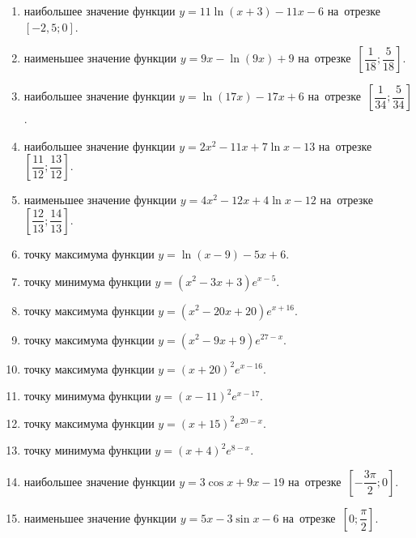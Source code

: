\documentclass[a4paper,10pt]{article}
\begin{document}
\begin{enumerate}
\item {} наибольшее значение функции $y = 11\ln \left(x+3\right)-11x -6$ на~отрезке~$\left[-2,5;0\right]$.

\item {} наименьшее значение функции $y = 9x-\ln \left(9x\right)+9$ на~отрезке~$\left[\dfrac{1}{18};\dfrac{5}{18}\right]$.

\item {} наибольшее значение функции $y = \ln \left(17x\right)-17x+6$ на~отрезке~$\left[\dfrac{1}{34};\dfrac{5}{34}\right]$.

\item {} наибольшее значение функции $y=2x^2-11x+7\ln x-13$ на~отрезке~$\left[\dfrac{11}{12};\dfrac{13}{12}\right]$.

\item {} наименьшее значение функции $y=4x^2-12x+4\ln x-12$ на~отрезке~$\left[\dfrac{12}{13};\dfrac{14}{13}\right]$.

\item {} точку максимума функции $y=\ln \left(x-9\right)-5x+6$.

\item {} точку минимума функции $y=\left(x^2-3x+3\right)e^{x-5}$.

\item {} точку максимума функции $y=\left(x^2-20x+20\right)e^{x+16}$.

\item {} точку максимума функции $y=\left(x^2-9x+9\right)e^{27-x}$.

\item {} точку максимума функции $y=\left(x +20\right)^2e^{x-16}$.

\item {} точку минимума функции $y=\left(x -11\right)^2e^{x-17}$.

\item {} точку максимума функции $y=\left(x +15\right)^2e^{20-x}$.

\item {} точку минимума функции $y=\left(x +4\right)^2e^{8-x}$.

\item {} наибольшее значение функции $y=3\cos x+9x -19$ на~отрезке~$\left[-\dfrac{3\pi }{2};0\right]$.

\item {} наименьшее значение функции $y=5x-3\sin x -6$ на~отрезке~$\left[0;\dfrac{\pi }{2}\right]$.


\end{enumerate}
\end{document}
